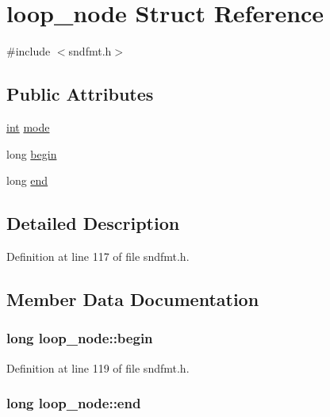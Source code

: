 \hypertarget{structloop__node}{}\section{loop\+\_\+node Struct Reference}
\label{structloop__node}


{\ttfamily \#include $<$sndfmt.\+h$>$}

\subsection*{Public Attributes}
\begin{DoxyCompactItemize}
\item 
\hyperlink{xmltok_8h_a5a0d4a5641ce434f1d23533f2b2e6653}{int} \hyperlink{structloop__node_a7783fbce6ff355aa1bb32cd0b5416cc1}{mode}
\item 
long \hyperlink{structloop__node_a83bee83861723ff6111f2f68f31c9e16}{begin}
\item 
long \hyperlink{structloop__node_a8a2f3298dae5a8f43d1d4ecd9e84dba7}{end}
\end{DoxyCompactItemize}


\subsection{Detailed Description}


Definition at line 117 of file sndfmt.\+h.



\subsection{Member Data Documentation}
\subsubsection[{\texorpdfstring{begin}{begin}}]{\setlength{\rightskip}{0pt plus 5cm}long loop\+\_\+node\+::begin}\hypertarget{structloop__node_a83bee83861723ff6111f2f68f31c9e16}{}\label{structloop__node_a83bee83861723ff6111f2f68f31c9e16}


Definition at line 119 of file sndfmt.\+h.

\subsubsection[{\texorpdfstring{end}{end}}]{\setlength{\rightskip}{0pt plus 5cm}long loop\+\_\+node\+::end}\hypertarget{structloop__node_a8a2f3298dae5a8f43d1d4ecd9e84dba7}{}\label{structloop__node_a8a2f3298dae5a8f43d1d4ecd9e84dba7}


